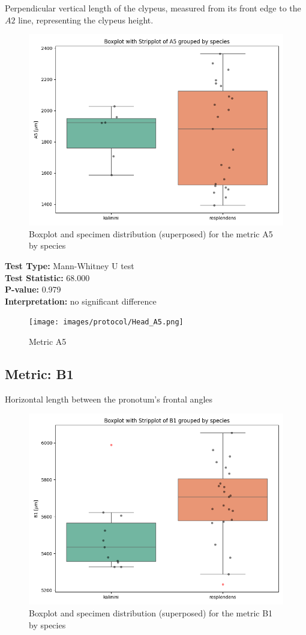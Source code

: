 Perpendicular vertical length of the clypeus, measured from its front edge to the $A2$ line, representing the clypeus height.

\begin{figure}[H]
\centering
\includegraphics[width=0.7\linewidth]{images/boxplot/boxplot_A5.png}
\caption{  Boxplot and specimen distribution (superposed) for the metric  A5 by species}
\end{figure}

\noindent\textbf{Test Type:} Mann-Whitney U test \\
\noindent\textbf{Test Statistic:} 68.000 \\
\noindent\textbf{P-value:} 0.979 \\
\noindent\textbf{Interpretation:} no significant difference

\begin{figure}[H]
\centering
\texttt{[image: images/protocol/Head\_A5.png]}
\caption{ Metric A5}
\end{figure}

\newpage
\subsection*{Metric: B1}

Horizontal length between the pronotum’s frontal angles

\begin{figure}[H]
\centering
\includegraphics[width=0.7\linewidth]{images/boxplot/boxplot_B1.png}
\caption{  Boxplot and specimen distribution (superposed) for the metric  B1 by species}
\end{figure}

